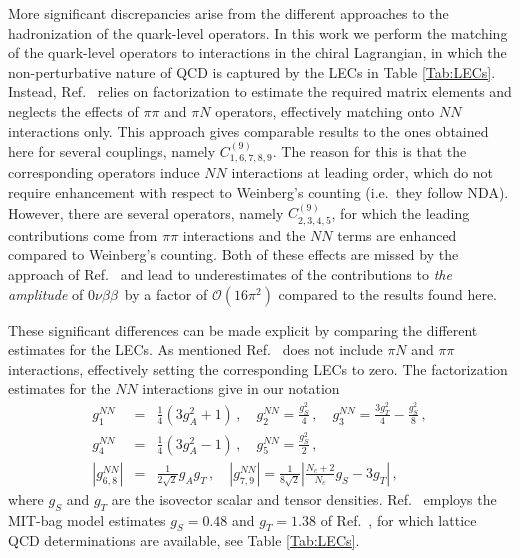 \documentclass[letterpaper,11pt]{article}
\newcommand{\bea}{\begin{eqnarray}}
\newcommand{\eea}{\end{eqnarray}}
\newcommand{\Or}{\mathcal O}
\newcommand{\sq}{^{2}}
\newcommand{\nn}{\nonumber}
\newcommand{\NLDBD}{$0 \nu \beta \beta$}
\begin{document}
More significant discrepancies arise from the different approaches to the hadronization of the quark-level operators. In this work we perform the matching of the quark-level operators to interactions in the chiral Lagrangian, in which the non-perturbative nature of QCD is captured by the LECs in Table \ref{Tab:LECs}. Instead, Ref.\ \cite{Pas:2000vn} relies on factorization to estimate the required matrix elements and neglects the effects of $\pi\pi$ and $\pi N$ operators, effectively matching onto $NN$ interactions only. This approach gives comparable results to the ones obtained here for several couplings,  namely $C^{(9)}_{1,6,7,8,9}$. The reason for this is that the corresponding operators induce  $NN$ interactions at leading order, which do not require enhancement with respect to Weinberg's counting (i.e.\ they follow NDA). 
However, there are several operators, namely $C^{(9)}_{2,3,4,5}$, for which the leading contributions come from $\pi\pi$ interactions and the $NN$ terms are enhanced compared to Weinberg's counting. Both of these effects are missed by the approach of Ref.\ \cite{Pas:2000vn} and lead to underestimates of the contributions to {{\em the amplitude}} of \NLDBD\ by  a factor of $\Or(16\pi\sq)$ compared  to the results found here.

These significant differences can be made explicit by comparing the different estimates for the LECs. As mentioned Ref.\ \cite{Pas:2000vn} does not include $\pi N$ and $\pi \pi$ interactions, effectively setting the corresponding LECs to zero. The factorization estimates for the $NN$ interactions give in our notation
\bea
\label{NNsuper}
g^{NN}_{1} &=& \frac{1}{4} ( 3 g_A^2 + 1)\,, \quad g^{NN}_{2} = \frac{g_S^2}{4}\,, \quad g^{NN}_{3} =  \frac{3 g_T^2}{4} - \frac{g_S^2}{8}\,, \nn \\
g_{4}^{NN} &=& \frac{1}{4} ( 3 g_A^2 - 1)\,, \quad g_{5}^{NN} = \frac{g_S^2}{2}\,,\nn\\
\left| g_{6,8}^{NN}\right| &=& \frac{1}{2\sqrt{2}} g_Ag_T \,,\quad \left|g_{7,9}^{NN}\right| = \frac{1}{8\sqrt{2}}\left|\frac{N_c+2}{N_c} g_S-3 g_T\right|\,,
\eea
where $g_S$ and $g_T$ are the isovector scalar and tensor densities. Ref.\ \cite{Pas:2000vn} employs the MIT-bag model estimates $g_S = 0.48$ and $g_T = 1.38$ of Ref.\ \cite{Adler:1975he}, for which  lattice QCD determinations are  available, see Table \ref{Tab:LECs}.  
\end{document}
